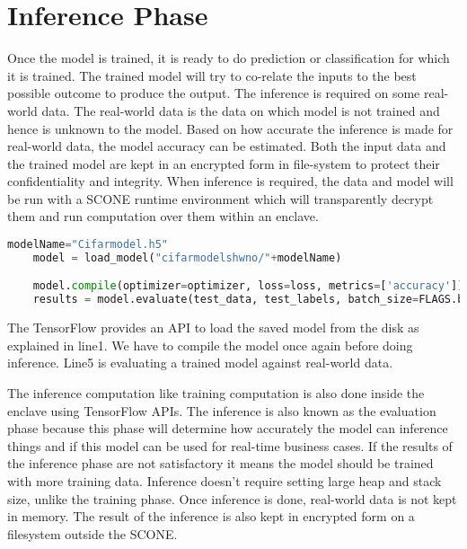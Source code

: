 \section{Inference Phase}
Once the model is trained, it is ready to do prediction or classification for which it is trained. The trained model will try to co-relate the inputs to the best possible outcome to produce the output. The inference is required on some real-world data. The real-world data is the data on which model is not trained and hence is unknown to the model. Based on how accurate the inference is made for real-world data, the model accuracy can be estimated. Both the input data and the trained model are kept in an encrypted form in file-system to protect their confidentiality and integrity. When inference is required, the data and model will be run with a SCONE runtime environment which will transparently decrypt them and run computation over them within an enclave. \linebreak

\begin{lstlisting}[language=Python]
    modelName="Cifarmodel.h5"
    model = load_model("cifarmodelshwno/"+modelName)

    model.compile(optimizer=optimizer, loss=loss, metrics=['accuracy'])
    results = model.evaluate(test_data, test_labels, batch_size=FLAGS.batch_size)
\end{lstlisting}
The TensorFlow provides an API to load the saved model from the disk as explained in line1. We have to compile the model once again before doing inference. Line5 is evaluating a trained model against real-world data.

 The inference computation like training computation is also done inside the enclave using TensorFlow APIs. The inference is also known as the evaluation phase because this phase will determine how accurately the model can inference things and if this model can be used for real-time business cases. If the results of the inference phase are not satisfactory it means the model should be trained with more training data. Inference doesn't require setting large heap and stack size, unlike the training phase. Once inference is done, real-world data is not kept in memory. The result of the inference is also kept in encrypted form on a filesystem outside the SCONE.